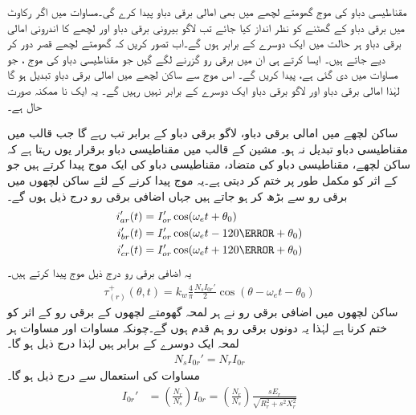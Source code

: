 مقناطیسی دباو کی موج  گھومتے لچھے میں بھی امالی برقی دباو پیدا کرے گی۔مساوات   میں  اگر رکاوٹ میں برقی دباو کے گھٹنے کو نظر انداز کیا جائے تب لاگو بیرونی برقی دباو اور لچھے کا اندرونی امالی برقی دباو ہر حالت میں ایک دوسرے کے برابر ہوں گے۔اب تصور کریں کہ گھومتے لچھے قصر دور کر دیے جاتے ہیں۔ ایسا کرتے ہی ان میں برقی رو گزرنے لگے گیں جو مقناطیسی دباو کی موج  ، جو مساوات   میں دی گئی ہے،  پیدا کریں گے۔ اس موج سے ساکن لچھے میں امالی برقی دباو  تبدیل ہو  گا لہٰذا امالی برقی دباو اور  لاگو برقی دباو ایک دوسرے کے برابر نہیں رہیں گے۔ یہ ایک نا ممکنہ صورت حال ہے۔

ساکن لچھے میں امالی برقی دباو،  لاگو برقی دباو کے برابر تب رہے گا جب قالب میں مقناطیسی دباو تبدیل نہ ہو۔ مشین کے قالب میں مقناطیسی دباو برقرار یوں رہتا ہے کہ ساکن لچھے،  مقناطیسی دباو   کی متضاد، مقناطیسی دباو کی ایک موج پیدا کرتے ہیں جو  کے اثر کو مکمل طور پر ختم کر دیتی ہے۔یہ موج پیدا کرنے کے لئے ساکن لچھوں میں برقی رو  سے بڑھ کر  ہو جاتے ہیں جہاں اضافی برقی رو درج ذیل ہوں  گے۔
\begin{gather}
\begin{aligned}\label{مساوات_امالی_تین_رو_الف}
i_{ar}'(t)&=I_{or}' \cos (\omega_e t+\theta_0)\\
i_{br}'(t)&=I_{or}' \cos (\omega_e t-120\degree+\theta_0)\\
i_{cr}'(t)&=I_{or}' \cos (\omega_e t+120\degree+\theta_0)
\end{aligned}
\end{gather}
یہ اضافی برقی رو درج ذیل موج پیدا کرتے ہیں۔
\begin{align}\label{مساوات_امالی_اضافی_موج}
\tau_{(r)}^+(\theta,t)=k_w \frac{4}{\pi}\frac{N_s I_{0r}'}{2} \cos (\theta-\omega_e t -\theta_0)
\end{align}
ساکن لچھوں میں اضافی برقی رو نے ہر لمحہ گھومتے لچھوں کے برقی رو کے اثر کو ختم کرنا ہے لہٰذا یہ دونوں برقی رو ہم قدم  ہوں گے۔چونکہ  مساوات  اور مساوات  ہر لمحہ ایک دوسرے کے  برابر ہیں لہٰذا درج ذیل ہو گا۔
\begin{align}
N_s I_{0r}'=N_r I_{0r}
\end{align}
مساوات  کی استعمال سے  درج ذیل ہو گا۔
\begin{align}\label{مساوات_امالی_گھومتے_لچھے_کا_ساکن_پر_رو_اثر}
I_{0r}'&=\left(\frac{N_r}{N_s}\right) I_{0r}=\left(\frac{N_r}{N_s}\right) \frac{s E_r}{\sqrt{R_r^2+s^2 X_r^2}}
\end{align}
